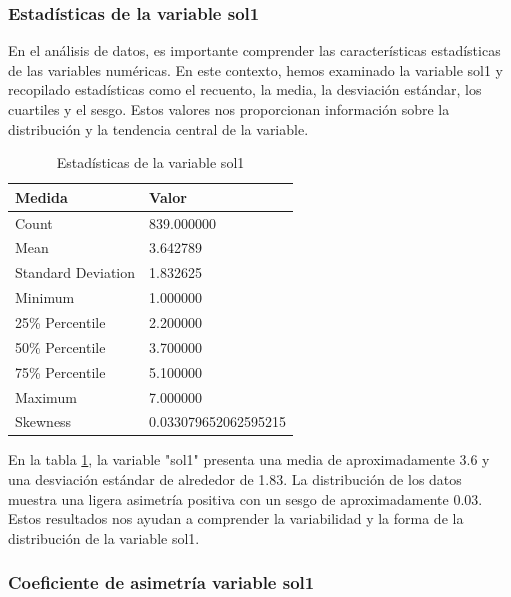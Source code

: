 \subsubsection{Estadísticas de la variable sol1}

En el análisis de datos, es importante comprender las características estadísticas de las variables numéricas. En este contexto, hemos examinado la variable sol1 y recopilado estadísticas como el recuento, la media, la desviación estándar, los cuartiles y el sesgo. Estos valores nos proporcionan información sobre la distribución y la tendencia central de la variable.

\begin{table}[H]
    \centering
    \caption{Estadísticas de la variable sol1}
    \begin{tabular}{ll}
        \hline
        \textbf{Medida}    & \textbf{Valor}       \\
        \hline
        Count              & 839.000000           \\
        Mean               & 3.642789             \\
        Standard Deviation & 1.832625             \\
        Minimum            & 1.000000             \\
        25\% Percentile    & 2.200000             \\
        50\% Percentile    & 3.700000             \\
        75\% Percentile    & 5.100000             \\
        Maximum            & 7.000000             \\
        Skewness           & 0.033079652062595215 \\
        \hline
    \end{tabular}%
    \label{tab:estadistica_variable_sol1}%
\end{table}%

En la tabla \ref{tab:estadistica_variable_sol1}, la variable "sol1" presenta una media de aproximadamente 3.6 y una desviación estándar de alrededor de 1.83. La distribución de los datos muestra una ligera asimetría positiva con un sesgo de aproximadamente 0.03. Estos resultados nos ayudan a comprender la variabilidad y la forma de la distribución de la variable sol1.

\subsubsection{Coeficiente de asimetría variable sol1}

